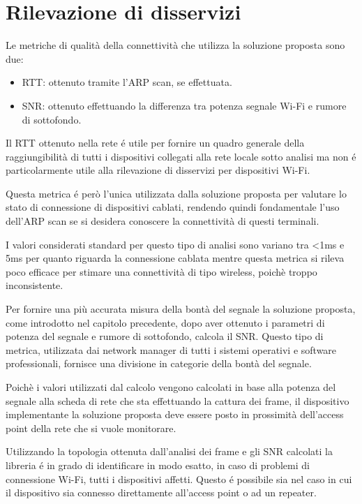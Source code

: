 \newpage 

\section{Rilevazione di disservizi}

Le metriche di qualit\`a della connettivit\`a  che utilizza la soluzione proposta sono due:
\begin{itemize}
	\item RTT: ottenuto tramite l'ARP scan, se effettuata.
	\item SNR: ottenuto effettuando la differenza tra potenza segnale Wi-Fi e rumore di sottofondo.
\end{itemize}

Il RTT ottenuto nella rete \'e utile per fornire un quadro generale della raggiungibilit\`a di tutti i dispositivi collegati alla rete locale sotto analisi ma non \'e particolarmente utile alla rilevazione di disservizi per dispositivi Wi-Fi.

Questa metrica \'e per\`o l'unica utilizzata dalla soluzione proposta per valutare lo stato di connessione di dispositivi cablati, rendendo quindi fondamentale l'uso dell'ARP scan se si desidera conoscere la connettivit\`a di questi terminali.

I valori considerati standard per questo tipo di analisi sono variano tra <1ms e 5ms per quanto riguarda la connessione cablata mentre questa metrica si rileva poco efficace per stimare una connettivit\`a di tipo wireless, poich\`e troppo inconsistente.

Per fornire una pi\`u accurata misura della bont\`a del segnale la soluzione proposta, come introdotto nel capitolo precedente, dopo aver ottenuto i parametri di potenza del segnale e rumore di sottofondo, calcola il SNR.
Questo tipo di metrica, utilizzata dai network manager di tutti i sistemi operativi e software professionali, fornisce una divisione in categorie della bont\`a del segnale.

Poich\`e i valori utilizzati dal calcolo vengono calcolati in base alla potenza del segnale alla scheda di rete che sta effettuando la cattura dei frame, il dispositivo implementante la soluzione proposta deve essere posto in prossimit\`a dell'access point della rete che si vuole monitorare.

Utilizzando la topologia ottenuta dall'analisi dei frame e gli SNR calcolati la libreria \'e in grado di identificare in modo esatto, in caso di problemi di connessione Wi-Fi, tutti i dispositivi affetti.
Questo \'e possibile sia nel caso in cui il dispositivo sia connesso direttamente all'access point o ad un repeater.

